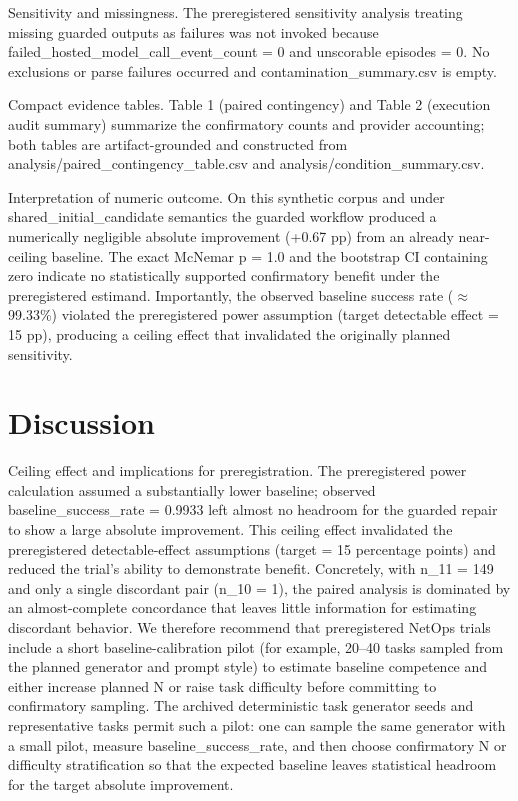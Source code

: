 \documentclass[conference]{IEEEtran}
\begin{document}
Sensitivity and missingness. The preregistered sensitivity analysis treating missing guarded outputs as failures was not invoked because failed\_hosted\_model\_call\_event\_count = 0 and unscorable episodes = 0. No exclusions or parse failures occurred and contamination\_summary.csv is empty.

Compact evidence tables. Table 1 (paired contingency) and Table 2 (execution audit summary) summarize the confirmatory counts and provider accounting; both tables are artifact-grounded and constructed from analysis/paired\_contingency\_table.csv and analysis/condition\_summary.csv.

Interpretation of numeric outcome. On this synthetic corpus and under shared\_initial\_candidate semantics the guarded workflow produced a numerically negligible absolute improvement (+0.67 pp) from an already near-ceiling baseline. The exact McNemar p = 1.0 and the bootstrap CI containing zero indicate no statistically supported confirmatory benefit under the preregistered estimand. Importantly, the observed baseline success rate (\ensuremath{\approx}99.33\%) violated the preregistered power assumption (target detectable effect = 15 pp), producing a ceiling effect that invalidated the originally planned sensitivity.

\section{Discussion}
Ceiling effect and implications for preregistration. The preregistered power calculation assumed a substantially lower baseline; observed baseline\_success\_rate = 0.9933 left almost no headroom for the guarded repair to show a large absolute improvement. This ceiling effect invalidated the preregistered detectable-effect assumptions (target = 15 percentage points) and reduced the trial's ability to demonstrate benefit. Concretely, with n\_11 = 149 and only a single discordant pair (n\_10 = 1), the paired analysis is dominated by an almost-complete concordance that leaves little information for estimating discordant behavior. We therefore recommend that preregistered NetOps trials include a short baseline-calibration pilot (for example, 20--40 tasks sampled from the planned generator and prompt style) to estimate baseline competence and either increase planned N or raise task difficulty before committing to confirmatory sampling. The archived deterministic task generator seeds and representative tasks permit such a pilot: one can sample the same generator with a small pilot, measure baseline\_success\_rate, and then choose confirmatory N or difficulty stratification so that the expected baseline leaves statistical headroom for the target absolute improvement.
\end{document}
